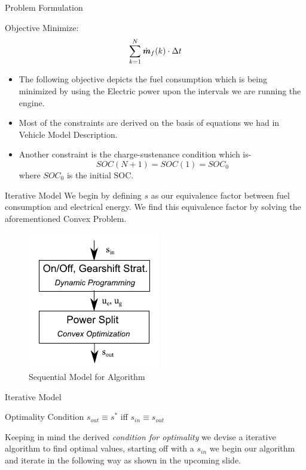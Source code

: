 \documentclass{beamer}
\begin{document}
\begin{frame}{Problem Formulation}
    \begin{block}{Objective}
    Minimize:
    \[
        \sum_{k=1}^N \dot{\textbf{\textit{m}}}_f(k)\cdot \Delta t
    \]
    \end{block}
    \begin{itemize}
        \item The following objective depicts the fuel consumption which is being minimized by using the Electric power upon the intervals we are running the engine.
        \item Most of the constraints are derived on the basis of equations we had in Vehicle Model Description.
        \item Another constraint is the charge-sustenance condition which is-
        \begin{equation*}
            SOC(N+1) = SOC(1) = SOC_0
        \end{equation*}
        where $SOC_0$ is the initial SOC.   \end{itemize}
    
\end{frame}

\begin{frame}{Iterative Model}
    We begin by defining $s$ as our equivalence factor between fuel consumption and electrical energy. We find this equivalence factor by solving the aforementioned Convex Problem.
    
    \begin{figure}
        \centering
        \includegraphics{Sequential.png}
        \caption{Sequential Model for Algorithm}
        \label{fig:seq}
    \end{figure}
\end{frame}

\begin{frame}{Iterative Model}
    \begin{block}{Optimality Condition}
        \centering
        $s_{out} \equiv s^*$ iff $s_{in} \equiv s_{out}$
    \end{block}
    
    
Keeping in mind the derived \emph{condition for optimality} we devise a iterative algorithm to find optimal values, starting off with a $s_{in}$ we begin our algorithm and iterate in the following way as shown in the upcoming slide.

\end{frame}
\end{document}
